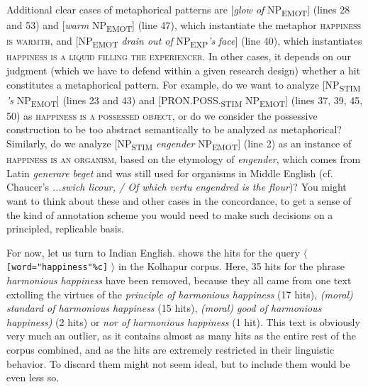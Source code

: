 Additional clear cases of metaphorical  patterns are [\textit{glow of} NP\textsubscript{EMOT}] (lines 28 and 53) and [\textit{warm} NP\textsubscript{EMOT}] (line 47), which instantiate the metaphor \textsc{happiness  is warmth}, and [NP\textsubscript{EMOT} \textit{drain out of} NP\textsubscript{EXP}\textit{'s} \textit{face}] (line 40), which instantiates \textsc{happiness is a liquid filling the experiencer}. In other cases, it depends on our judgment (which we have to defend within a given research design)  whether a hit constitutes a metaphorical  pattern. For example, do we want to analyze [NP\textsubscript{STIM} \textit{'s} NP\textsubscript{EMOT}] (lines 23 and 43) and [PRON.POSS.\textsubscript{STIM} NP\textsubscript{EMOT}] (lines 37, 39, 45, 50) as \textsc{happiness is a possessed object}, or do we consider the possessive  construction to be too abstract semantically  to be analyzed as metaphorical? Similarly, do we analyze [NP\textsubscript{STIM} \textit{engender} NP\textsubscript{EMOT}] (line 2) as an instance of \textsc{happiness  is an organism}, based on the etymology of \textit{engender}, which comes from Latin \textit{generare} \textit{beget} and was still used for organisms in Middle English (cf. Chaucer's \textit{...swich licour, / Of which vertu engendred is the flour})? You might want to think about these and other cases in the concordance,  to get a sense of the kind of annotation  scheme you would need to make such decisions on a principled, replicable  basis.

For now, let us turn to Indian  English.   shows the hits for the query $\langle$ \texttt{[word="happiness"\%c]} $\rangle$ in the Kolhapur  corpus. Here, 35 hits for the phrase \textit{harmonious happiness} have been removed, because they all came from one text extolling the virtues of the \textit{principle of harmonious happiness} (17 hits), \textit{(moral) standard of harmonious happiness} (15 hits), \textit{(moral) good of harmonious happiness)} (2 hits) or \textit{nor of harmonious happiness}  (1 hit). This text is obviously very much an outlier, as it contains almost as many hits as the entire rest of the corpus combined, and as the hits are extremely restricted in their linguistic behavior. To discard them might not seem ideal, but to include them would be even less so.

